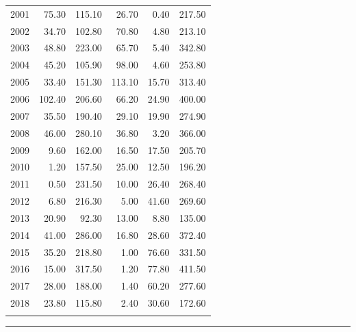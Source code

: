 \documentclass[12pt,]{article}
\begin{document}
\begin{longtable}{rrrrrr}
  2001 & 75.30 & 115.10 & 26.70 & 0.40 & 217.50 \\ 
  2002 & 34.70 & 102.80 & 70.80 & 4.80 & 213.10 \\ 
  2003 & 48.80 & 223.00 & 65.70 & 5.40 & 342.80 \\ 
  2004 & 45.20 & 105.90 & 98.00 & 4.60 & 253.80 \\ 
  2005 & 33.40 & 151.30 & 113.10 & 15.70 & 313.40 \\ 
  2006 & 102.40 & 206.60 & 66.20 & 24.90 & 400.00 \\ 
  2007 & 35.50 & 190.40 & 29.10 & 19.90 & 274.90 \\ 
  2008 & 46.00 & 280.10 & 36.80 & 3.20 & 366.00 \\ 
  2009 & 9.60 & 162.00 & 16.50 & 17.50 & 205.70 \\ 
  2010 & 1.20 & 157.50 & 25.00 & 12.50 & 196.20 \\ 
  2011 & 0.50 & 231.50 & 10.00 & 26.40 & 268.40 \\ 
  2012 & 6.80 & 216.30 & 5.00 & 41.60 & 269.60 \\ 
  2013 & 20.90 & 92.30 & 13.00 & 8.80 & 135.00 \\ 
  2014 & 41.00 & 286.00 & 16.80 & 28.60 & 372.40 \\ 
  2015 & 35.20 & 218.80 & 1.00 & 76.60 & 331.50 \\ 
  2016 & 15.00 & 317.50 & 1.20 & 77.80 & 411.50 \\ 
  2017 & 28.00 & 188.00 & 1.40 & 60.20 & 277.60 \\ 
  2018 & 23.80 & 115.80 & 2.40 & 30.60 & 172.60 \\ 
   \hline
\hline
\label{tab:Reconstructed_Landings_byState}
\end{longtable}

\begin{center}\rule{0.5\linewidth}{\linethickness}\end{center}

\FloatBarrier
\newpage
\end{document}
